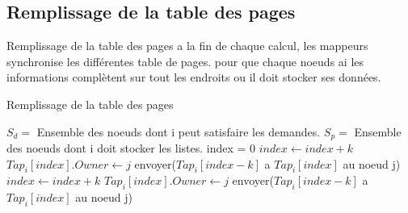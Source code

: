 \documentclass[10pt, c]{beamer}
\begin{document}
    \subsection{Remplissage de la table des pages}
    	 \begin{frame}{Remplissage de la table des pages}
    	  a la fin de chaque calcul, les mappeurs synchronise les différentes table de pages. pour que chaque noeuds ai les informations complètent sur tout les endroits ou il doit stocker ses données. 
    	 \end{frame}
    	 \begin{frame}{Remplissage de la table des pages}
            \begin{algorithm}[H]
                \caption{Synchronisation des tables des pages}
                \begin{algorithmic}
                    \STATE   $S_d =$ Ensemble des noeuds dont i peut satisfaire les demandes.
                    \STATE $S_p =$ Ensemble des noeuds dont i doit stocker les listes.
                    \STATE index = 0
                            \STATE $index \leftarrow index + k$
                            \STATE $Tap_i[index].Owner \leftarrow j$
                        \ENDFOR
                        \STATE envoyer($Tap_i[index -k ]$ a $Tap_i[index ] $ au noeud j)
                    \ENDFOR
                            \STATE $index \leftarrow index + k$
                            \STATE $Tap_i[index].Owner \leftarrow j$
                        \ENDFOR
                        \STATE envoyer($Tap_i[index -k ]$ a $Tap_i[index ] $ au noeud j)
                    \ENDFOR
                \end{algorithmic}
            \end{algorithm}
        \end{frame}
\end{document}
